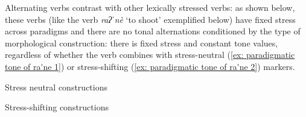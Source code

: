 	\z
\z

Alternating verbs contrast with other lexically stressed verbs: as shown below, these verbs (like the verb \textit{raʔˈnè} ‘to shoot' exemplified below) have fixed stress across paradigms and there are no tonal alternations conditioned by the type of morphological construction: there is fixed stress and constant tone values, regardless of whether the verb combines with stress-neutral (\ref{ex: paradigmatic tone of ra'ne 1}) or stress-shifting (\ref{ex: paradigmatic tone of ra'ne 2}) markers.

\ea\label{ex: paradigmatic tone of ra'ne 1}
{Stress neutral constructions}

    \z
\z

\ea\label{ex: paradigmatic tone of ra'ne 2}
{Stress-shifting constructions}

    \z
\z

